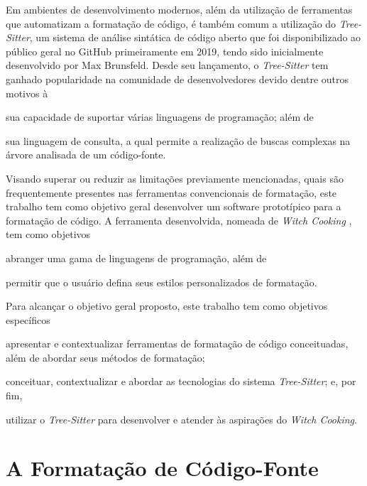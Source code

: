 \documentclass
  [11pt,a4paper,english,brazil,openright,sumario=tradicional,twoside]
  {abntex2}
\newcommand{\treesitter}{\textit{Tree-Sitter}\xspace}
\newcommand{\witchcooking}{\textit{Witch Cooking}\xspace}
\begin{document}
  Em ambientes de desenvolvimento modernos, além da utilização de ferramentas
  que automatizam a formatação de código, é também comum a utilização do
  \treesitter \cite{tree-sitter-2018-tree}, um sistema de análise sintática de
  código aberto que foi disponibilizado ao público geral no GitHub
  primeiramente em 2019, tendo sido inicialmente desenvolvido por Max
  Brunsfeld. Desde seu lançamento, o \treesitter tem ganhado popularidade na
  comunidade de desenvolvedores devido dentre outros motivos à
  \begin{inparaenum}
    \item sua capacidade de suportar várias linguagens de programação; além de
    \item sua linguagem de consulta, a qual permite a realização de buscas
          complexas na árvore analisada de um código-fonte.
  \end{inparaenum}

  Visando superar ou reduzir as limitações previamente mencionadas, quais são
  frequentemente presentes nas ferramentas convencionais de formatação, este
  trabalho tem como objetivo geral desenvolver um software prototípico para a
  formatação de código. A ferramenta desenvolvida, nomeada de \witchcooking
  \cite{silva-2023-witch}, tem como objetivos
  \begin{inparaenum}
    \item abranger uma gama de linguagens de programação, além de
    \item permitir que o usuário defina seus estilos personalizados de
          formatação.
  \end{inparaenum}

  Para alcançar o objetivo geral proposto, este trabalho tem como objetivos
  específicos
  \begin{inparaenum}
    \item apresentar e contextualizar ferramentas de formatação de código
          conceituadas, além de abordar seus métodos de formatação;
    \item conceituar, contextualizar e abordar as tecnologias do sistema
          \treesitter; e, por fim,
    \item utilizar o \treesitter para desenvolver e atender às aspirações do
          \witchcooking.
  \end{inparaenum}


  \chapter{A Formatação de Código-Fonte}
\end{document}
